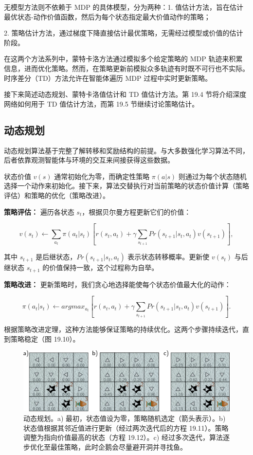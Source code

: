 无模型方法则不依赖于 MDP 的具体模型，分为两种：1. 值估计方法，旨在估计最优状态-动作价值函数，然后为每个状态指定最大价值动作的策略；

2. 策略估计方法，通过梯度下降直接估计最优策略，无需经过模型或价值的估计阶段。

在这两个方法系列中，蒙特卡洛方法通过模拟多个给定策略的 MDP 轨迹来积累信息，进而优化策略。然而，在策略更新前模拟众多轨迹有时既不可行也不实际。时序差分（TD）方法允许在智能体遍历 MDP 过程中实时更新策略。

接下来简述动态规划、蒙特卡洛值估计和 TD 值估计方法。第 19.4 节将介绍深度网络如何用于 TD 值估计方法，而第 19.5 节继续讨论策略估计。


\subsection{动态规划}
动态规划算法基于完整了解转移和奖励结构的前提。与大多数强化学习算法不同，后者依靠观测智能体与环境的交互来间接获得这些数据。

状态价值 \(v(s)\) 通常初始化为零，而确定性策略 \(\pi(a|s)\) 则通过为每个状态随机选择一个动作来初始化。接下来，算法交替执行对当前策略的状态价值计算（策略评估）和策略的优化（策略改进）。

\textbf{策略评估：} 遍历各状态 \(s_t\)，根据贝尔曼方程更新它们的价值：

\begin{equation}
v(s_t) \leftarrow \sum_{a_t} \pi(a_t|s_t) \left[ r(s_t, a_t) + \gamma \sum_{s_{t+1}} Pr(s_{t+1}|s_t, a_t)v(s_{t+1}) \right], 
\end{equation}

其中 \(s_{t+1}\) 是后继状态，\(Pr(s_{t+1}|s_t, a_t)\) 表示状态转移概率。更新使 \(v(s_t)\) 与后继状态 \(s_{t+1}\) 的价值保持一致，这个过程称为自举。

\textbf{策略改进：} 更新策略时，我们贪心地选择能使每个状态价值最大化的动作：

\begin{equation}
\pi(a_t|s_t) \leftarrow argmax_{a_t} \left[ r(s_t, a_t) + \gamma \sum_{s_{t+1}} Pr(s_{t+1}|s_t, a_t)v(s_{t+1}) \right]. 
\end{equation}

根据策略改进定理，这种方法能够保证策略的持续优化。这两个步骤持续迭代，直到策略稳定（图 19.10）。

\begin{figure}[ht!]
\centering
\includegraphics[width=0.7\linewidth]{png/chapter19/ReinforceDP.png}
\caption{动态规划。a) 最初，状态值设为零，策略随机选定（箭头表示）。b) 状态值根据其邻近值进行更新（经过两次迭代后的方程 19.11）。策略调整为指向价值最高的状态（方程 19.12）。c) 经过多次迭代，算法逐步优化至最佳策略，此时企鹅会尽量避开洞并寻找鱼。}
\end{figure}

